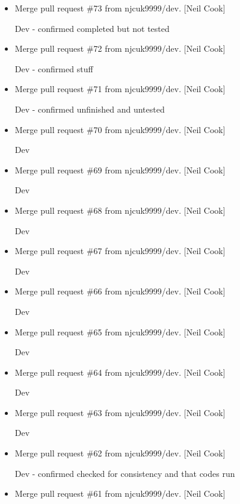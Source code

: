 \documentclass[a4paper,10pt,english]{report}
\begin{document}
\begin{itemize}
\item {} 
Merge pull request \#73 from njcuk9999/dev. {[}Neil Cook{]}

Dev - confirmed  completed but not tested

\item {} 
Merge pull request \#72 from njcuk9999/dev. {[}Neil Cook{]}

Dev - confirmed  stuff

\item {} 
Merge pull request \#71 from njcuk9999/dev. {[}Neil Cook{]}

Dev - confirmed unfinished and untested

\item {} 
Merge pull request \#70 from njcuk9999/dev. {[}Neil Cook{]}

Dev

\item {} 
Merge pull request \#69 from njcuk9999/dev. {[}Neil Cook{]}

Dev

\item {} 
Merge pull request \#68 from njcuk9999/dev. {[}Neil Cook{]}

Dev

\item {} 
Merge pull request \#67 from njcuk9999/dev. {[}Neil Cook{]}

Dev

\item {} 
Merge pull request \#66 from njcuk9999/dev. {[}Neil Cook{]}

Dev

\item {} 
Merge pull request \#65 from njcuk9999/dev. {[}Neil Cook{]}

Dev

\item {} 
Merge pull request \#64 from njcuk9999/dev. {[}Neil Cook{]}

Dev

\item {} 
Merge pull request \#63 from njcuk9999/dev. {[}Neil Cook{]}

Dev

\item {} 
Merge pull request \#62 from njcuk9999/dev. {[}Neil Cook{]}

Dev - confirmed checked for consistency and that codes run

\item {} 
Merge pull request \#61 from njcuk9999/dev. {[}Neil Cook{]}


\end{itemize}
\end{document}

